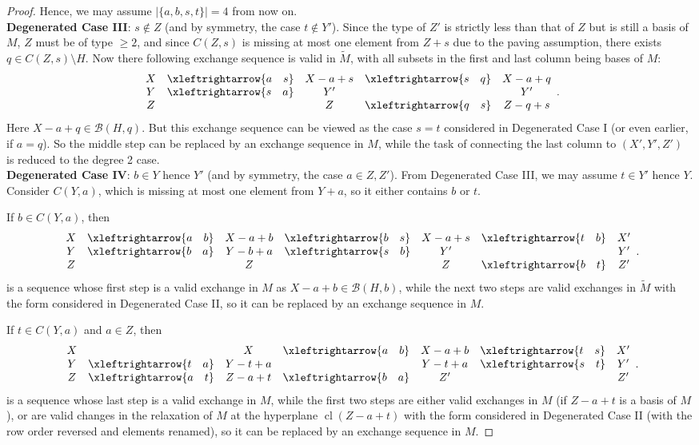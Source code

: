 \documentclass{amsart}
\newcommand{\swap}[2]{\xleftrightarrow{#1 \quad #2}}
\newcommand\Bcal{{\mathcal B}}
\DeclareMathOperator{\cl}{cl}
\begin{document}
\begin{proof}
    Hence, we may assume $|\{a,b,s,t\}|=4$ from now on.\\

    {\bf Degenerated Case III}:  $s\not\in Z$ (and by symmetry, the case $t\not\in Y'$). Since the type of $Z'$ is strictly less than that of $Z$ but is still a basis of $M$, $Z$ must be of type $\geq 2$, and since $C(Z,s)$ is missing at most one element from $Z+s$ due to the paving assumption, there exists $q\in C(Z,s)\setminus H$. Now there following exchange sequence is valid in $\widetilde{M}$, with all subsets in the first and last column being bases of $M$:
$$
\begin{array}{c c c c c}
   X   & \swap{a}{s} & X-a+s   & \swap{s}{q} & X-a+q \\
   Y & \swap{s}{a} & Y' &             & Y' \\
   Z &             & Z  & \swap{q}{s} & Z-q+s
\end{array}.
$$
Here $X-a+q\in\Bcal(H,q)$. But this exchange sequence can be viewed as the case $s=t$ considered in Degenerated Case I (or even earlier, if $a=q$). So the middle step can be replaced by an exchange sequence in $M$, while the task of connecting the last column to $(X',Y',Z')$ is reduced to the degree 2 case.\\

{\bf Degenerated Case IV}: $b\in Y$ hence $Y'$ (and by symmetry, the case $a\in Z,Z'$). From Degenerated Case III, we may assume $t\in Y'$ hence $Y$. Consider $C(Y,a)$, which is missing at most one element from $Y+a$, so it either contains $b$ or $t$.

If $b\in C(Y,a)$, then
$$
\begin{array}{c c c c c c c}
   X   & \swap{a}{b} & X-a+b & \swap{b}{s} & X-a+s  & \swap{t}{b} & X' \\
   Y & \swap{b}{a} & Y-b+a & \swap{s}{b} & Y' &             & Y' \\
   Z &             & Z &             & Z  & \swap{b}{t} & Z'
\end{array}.
$$
is a sequence whose first step is a valid exchange in $M$ as $X-a+b\in\Bcal(H,b)$, while the next two steps are valid exchanges in $\widetilde{M}$ with the form considered in Degenerated Case II, so it can be replaced by an exchange sequence in $M$.

If $t\in C(Y,a)$ and $a\in Z$, then
$$
\begin{array}{c c c c c c c}
   X &             & X       & \swap{a}{b} & X-a+b  & \swap{t}{s} & X' \\
   Y & \swap{t}{a} & Y-t+a &            & Y-t+a & \swap{s}{t}  & Y' \\
   Z & \swap{a}{t}  & Z-a+t & \swap{b}{a}  & Z'  &            & Z'
\end{array}.
$$
is a sequence whose last step is a valid exchange in $M$, while the first two steps are either valid exchanges in $M$ (if $Z-a+t$ is a basis of $M$), or are valid changes in the relaxation of $M$ at the hyperplane $\cl(Z-a+t)$ with the form considered in Degenerated Case II (with the row order reversed and elements renamed), so it can be replaced by an exchange sequence in $M$.


\end{proof}
\end{document}
